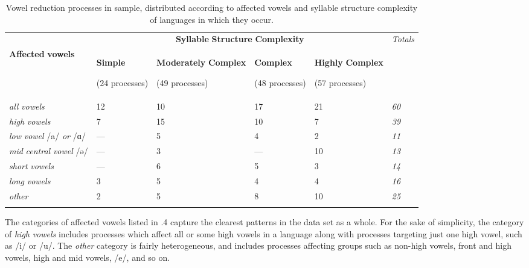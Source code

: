 \begin{table}
\begin{tabularx}{\textwidth}{XXXXXX}
\lsptoprule
 & \multicolumn{4}{c}{ \textbf{Syllable} \textbf{Structure} \textbf{Complexity}} & \textit{Totals}\\
 \textbf{Affected} \textbf{vowels} & { \textbf{Simple}}

 (24 processes) & { \textbf{Moderately} \textbf{Complex}}

 (49 processes) & { \textbf{Complex}}

 (48 processes) & { \textbf{Highly} \textbf{Complex}}

 (57 processes) & \\
 \textit{all} \textit{vowels} & 12 & 10 & 17 & 21 & \textit{60}\\
 \textit{high} \textit{vowels} & 7 & 15 & 10 & 7 & \textit{39}\\
 \textit{low} \textit{vowel} /a/ \textit{or} /ɑ/ & — & 5 & 4 & 2 & \textit{11}\\
 \textit{mid} \textit{central} \textit{vowel} /ə/ & — & 3 & — & 10 & \textit{13}\\
 \textit{short} \textit{vowels} & — & 6 & 5 & 3 & \textit{14}\\
 \textit{long} \textit{vowels} & 3 & 5 & 4 & 4 & \textit{16}\\
 \textit{other} & 2 & 5 & 8 & 10 & \textit{25}\\
\lspbottomrule
\end{tabularx}
\caption{\label{6.4}Vowel reduction processes in sample, distributed according to affected vowels and syllable structure complexity of languages in which they occur.}
\end{table}




The categories of affected vowels listed in .4 capture the clearest patterns in the data set as a whole. For the sake of simplicity, the category of \textit{high} \textit{vowels} includes processes which affect all or some high vowels in a language along with processes targeting just one high vowel, such as /i/ or /u/. The \textit{other} category is fairly heterogeneous, and includes processes affecting groups such as non-high vowels, front and high vowels, high and mid vowels, /e/, and so on.



